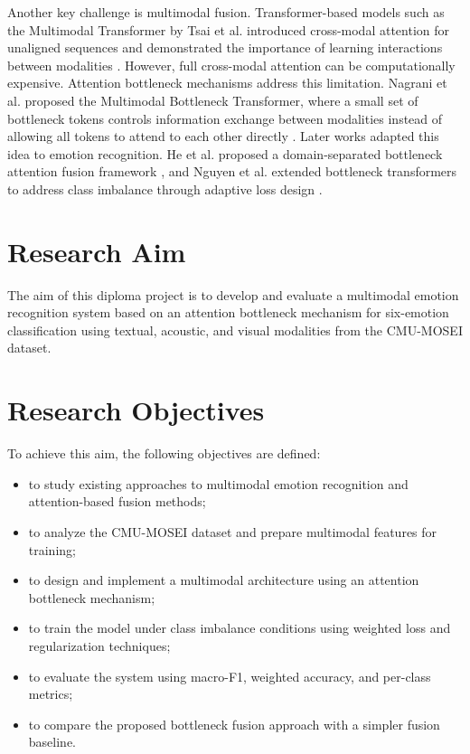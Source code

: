 Another key challenge is multimodal fusion. Transformer-based models such as the Multimodal Transformer by Tsai et al. introduced cross-modal attention for unaligned sequences and demonstrated the importance of learning interactions between modalities \cite{tsai2019multimodal}. However, full cross-modal attention can be computationally expensive. Attention bottleneck mechanisms address this limitation. Nagrani et al. proposed the Multimodal Bottleneck Transformer, where a small set of bottleneck tokens controls information exchange between modalities instead of allowing all tokens to attend to each other directly \cite{nagrani2021attention}. Later works adapted this idea to emotion recognition. He et al. proposed a domain-separated bottleneck attention fusion framework \cite{he2024domain}, and Nguyen et al. extended bottleneck transformers to address class imbalance through adaptive loss design \cite{nguyen2025enhanced}.

\section*{Research Aim}

The aim of this diploma project is to develop and evaluate a multimodal emotion recognition system based on an attention bottleneck mechanism for six-emotion classification using textual, acoustic, and visual modalities from the CMU-MOSEI dataset.

\section*{Research Objectives}

To achieve this aim, the following objectives are defined:

\begin{itemize}
    \item to study existing approaches to multimodal emotion recognition and attention-based fusion methods;
    \item to analyze the CMU-MOSEI dataset and prepare multimodal features for training;
    \item to design and implement a multimodal architecture using an attention bottleneck mechanism;
    \item to train the model under class imbalance conditions using weighted loss and regularization techniques;
    \item to evaluate the system using macro-F1, weighted accuracy, and per-class metrics;
    \item to compare the proposed bottleneck fusion approach with a simpler fusion baseline.
\end{itemize}


